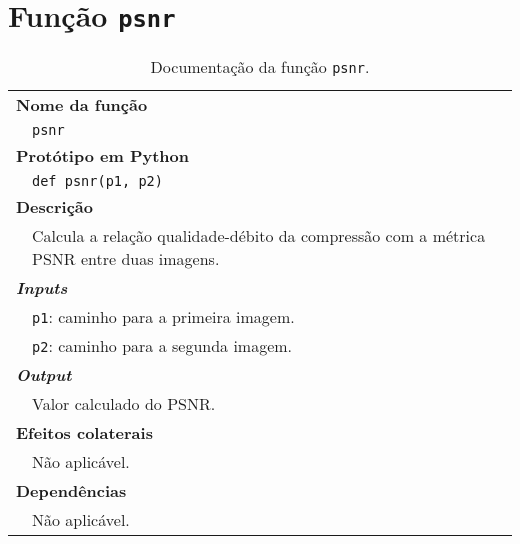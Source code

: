 
\newpage
\section{Função \texttt{psnr}}
\label{sec::doc-codigo:psnr}

\begin{table}[!hp]
    \centering
    \caption{Documentação da função \texttt{psnr}.}
    \label{tab:psnr}
    \begin{tabular}{p{1cm} p{11.5cm}}
        \hline
        \multicolumn{2}{l}{\bfseries\small Nome da função}\\
         & \verb|psnr|\\
        \hline
        \multicolumn{2}{l}{\bfseries\small Protótipo em Python}\\
         & \texttt{def psnr(p1, p2)} \\
        \hline\multicolumn{2}{l}{\bfseries\small Descrição}\\
         & Calcula a relação qualidade-débito da compressão com a métrica \ac{PSNR} entre duas imagens. \\
        \hline\multicolumn{2}{l}{\bfseries\small \textit{Inputs}}\\
         & \verb|p1|: caminho para a primeira imagem. \\
         & \verb|p2|: caminho para a segunda imagem. \\
        \hline\multicolumn{2}{l}{\bfseries\small \textit{Output}}\\
         & Valor calculado do \ac{PSNR}. \\
        \hline\multicolumn{2}{l}{\bfseries\small Efeitos colaterais}\\
         & Não aplicável. \\
        \hline\multicolumn{2}{l}{\bfseries\small Dependências}\\
         & Não aplicável. \\
        \hline
    \end{tabular}
\end{table}
